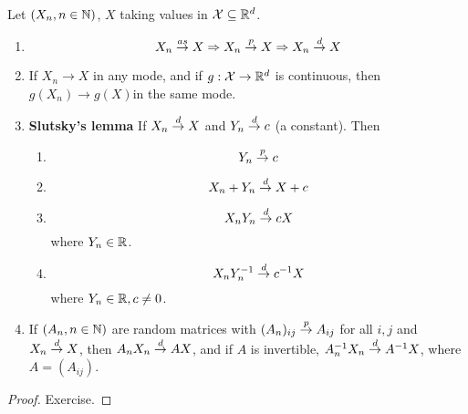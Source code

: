 \begin{proposition}
  Let $(X_{n}, n \in \mathbb{N})$, $X$ taking values in $\mathcal{X} \subseteq
  \mathbb{R}^{d}$.
  \begin{enumerate}
  \item
    \begin{equation}
      \label{eq:9}
      X_{n} \overset{as}{\rightarrow} X \Rightarrow X_{n} \overset{p}{\rightarrow} X \Rightarrow X_{n} \overset{d}{\rightarrow} X
    \end{equation}
  \item If $X_{n} \rightarrow X$ in any mode, and if $g: \mathcal{X}
    \rightarrow \mathbb{R}^{d}$ is continuous, then $g(X_{n}) \rightarrow
    g(X)$in the same mode.
  \item \textbf{Slutsky's lemma} If $X_{n} \overset{d}{\rightarrow} X$ and $Y_{n} \overset{d}{\rightarrow} c$ (a
    constant).  Then
    \begin{enumerate}
    \item
      \begin{equation}
        \label{eq:10}
        Y_{n} \overset{p}{\rightarrow} c
      \end{equation}
    \item
      \begin{equation}
        \label{eq:11}
        X_{n} + Y_{n}\overset{d}{\rightarrow} X + c
      \end{equation}

    \item
      \begin{equation}
        \label{eq:12}
        X_{n} Y_{n} \overset{d}{\rightarrow} cX
      \end{equation} where $Y_{n} \in \mathbb{R}$.
    \item
      \begin{equation}
        \label{eq:13}
        X_{n} Y_{n}^{{-1}} \overset{d}{\rightarrow} c^{-1} X
      \end{equation} where $Y_{n} \in \mathbb{R}, c \neq 0$.
    \end{enumerate}
  \item If $(A_{n}, n \in \mathbb{N})$ are random matrices with
    $(A_{n})_{{ij}} \overset{p}{\rightarrow} A_{ij}$ for all $i, j$ and $X_{n} \overset{d}{\rightarrow} X$, then
    $A_{n} X_{n} \overset{d}{\rightarrow} AX$, and if $A$ is invertible, $A_{n}^{-1} X_{n}
    \overset{d}{\rightarrow} A^{-1}X$, where $A = (A_{ij})$.
  \end{enumerate}
\end{proposition}

\begin{proof}
  Exercise.
\end{proof}

